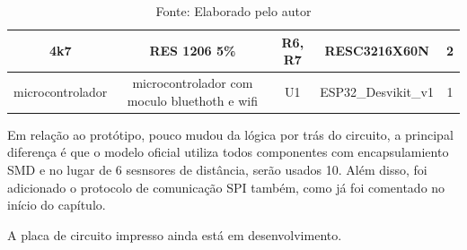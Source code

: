\documentclass[../delivery_hospital_report.tex]{subfiles}
\begin{document}
\begin{table}[]
\begin{adjustbox}{width=\columnwidth,center}
\begin{tabular}{|c|c|c|c|c|}
4k7                  & RES 1206 5\%                                                   & R6, R7                                                                                                                   & RESC3216X60N           & 2        \\ \hline
microcontrolador     & microcontrolador com   moculo bluethoth e wifi                 & U1                                                                                                                       & ESP32\_Desvikit\_v1    & 1        \\ \hline

\end{tabular}
\end{adjustbox}
\centering
\caption*{Fonte: Elaborado pelo autor}
\label{table:voc}
\end{table}

Em relação ao protótipo, pouco mudou da lógica por trás do circuito, a principal diferença é que o modelo oficial utiliza todos componentes com encapsulamiento SMD \cite{SMD_def} e no lugar de 6 sesnsores de distância, serão usados 10. Além disso, foi adicionado o protocolo de comunicação SPI também, como já foi comentado no início do capítulo.


A placa de circuito impresso ainda está em desenvolvimento.

\end{document}
